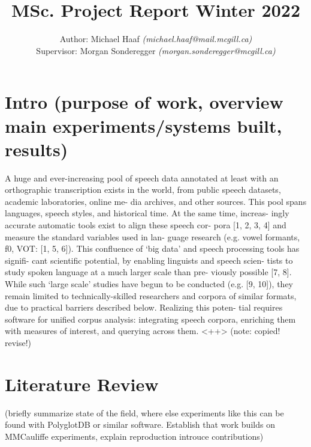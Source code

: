 \documentclass[11pt]{article}
\begin{document}
\title{MSc. Project Report Winter 2022}
\author{Author: Michael Haaf \textit{(michael.haaf@mail.mcgill.ca)} \\ Supervisor: Morgan Sonderegger \textit{(morgan.sonderegger@mcgill.ca)}}

\maketitle


\section{Intro (purpose of work, overview main experiments/systems built, results)}



A huge and ever-increasing pool of speech data annotated at
least with an orthographic transcription exists in the world,
from public speech datasets, academic laboratories, online me-
dia archives, and other sources. This pool spans languages,
speech styles, and historical time. At the same time, increas-
ingly accurate automatic tools exist to align these speech cor-
pora [1, 2, 3, 4] and measure the standard variables used in lan-
guage research (e.g. vowel formants, f0, VOT: [1, 5, 6]). This
confluence of ‘big data’ and speech processing tools has signifi-
cant scientific potential, by enabling linguists and speech scien-
tists to study spoken language at a much larger scale than pre-
viously possible [7, 8]. While such ‘large scale’ studies have
begun to be conducted (e.g. [9, 10]), they remain limited to
technically-skilled researchers and corpora of similar formats,
due to practical barriers described below. Realizing this poten-
tial requires software for unified corpus analysis: integrating
speech corpora, enriching them with measures of interest, and
querying across them.
<++> (note: copied! revise!)

\section{Literature Review}

(briefly summarize state of the field, where else experiments like this can be found with PolyglotDB or similar software. Establish that work builds on MMCauliffe experiments, explain reproduction introuce contributions)
\end{document}

